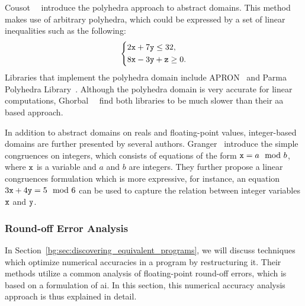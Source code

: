 Cousot~\etal~\cite{cousot78} introduce the polyhedra approach to abstract
domains.  This method makes use of arbitrary polyhedra, which could be
expressed by a set of linear inequalities such as the following:
\begin{equation}
    \left\{
    \begin{aligned}
        & 2\texttt{x} + 7\texttt{y} \leq 32, \\
        & 8\texttt{x} - 3\texttt{y} + \texttt{z} \geq 0.
    \end{aligned}
    \right.
\end{equation}
Libraries that implement the polyhedra domain include APRON~\cite{apron} and
Parma Polyhedra Library~\cite{ppl}.  Although the polyhedra domain is very
accurate for linear computations, Ghorbal~\etal~\cite{ghorbal09} find both
libraries to be much slower than their \gls{aa} based approach.

In addition to abstract domains on reals and floating-point values,
integer-based domains are further presented by several authors.
Granger~\cite{granger89} introduce the simple congruences on integers,
which consists of equations of the form $\texttt{x} = a \mod b$, where $\texttt{x}$
is a variable and $a$ and $b$ are integers.  They further propose a linear
congruences formulation which is more expressive, for instance, an equation $3
\texttt{x} + 4 \texttt{y} = 5 \mod 6$ can be used to capture the relation between integer
variables $\texttt{x}$ and $\texttt{y}$.

\subsubsection{Round-off Error Analysis}
\label{bg:ssub:accuracy}


In Section~\ref{bg:sec:discovering_equivalent_programs}, we will discuss
techniques which optimize numerical accuracies in a program by restructuring
it.  Their methods utilize a common analysis of floating-point round-off
errors, which is based on a formulation of \gls{ai}\@.  In this section, this
numerical accuracy analysis approach is thus explained in detail.

